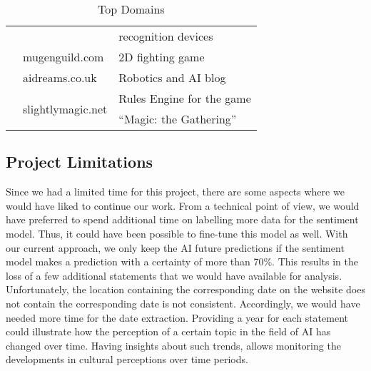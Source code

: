 \begin{table}
{\begin{tabular}{rll}
                                  &                                         & recognition devices\\
        \addlinespace[0.7em]
        {58\quad}                 & mugenguild.com                          & 2D fighting game \\
        \addlinespace[0.7em]
        {52\quad}                 & aidreams.co.uk                          & Robotics and AI blog\\
        \addlinespace[0.7em]
        \multirow{2}{*}{51\quad}  & \multirow{2}{*}{slightlymagic.net}      & Rules Engine for the game \\
                                  &                                         & ``Magic: the Gathering'' \\
        \bottomrule
    \end{tabular}
    }
\caption{\label{Top-Domains}
Top Domains
}
\end{table}
\subsection{Project Limitations}

Since we had a limited time for this project, there are some aspects where we would have liked to continue our work.
From a technical point of view, we would have preferred to spend additional time on labelling more data for the sentiment model.
Thus, it could have been possible to fine-tune this model as well.
With our current approach, we only keep the AI future predictions if the sentiment model makes a prediction with a certainty of more than 70\%.
This results in the loss of a few additional statements that we would have available for analysis.
\\
Unfortunately, the location containing the corresponding date on the website does not contain the corresponding date is not consistent.
Accordingly, we would have needed more time for the date extraction.
Providing a year for each statement could illustrate how the perception of a certain topic in the field of AI has changed over time.
Having insights about such trends, allows monitoring the developments in cultural perceptions over time periods.
\\





